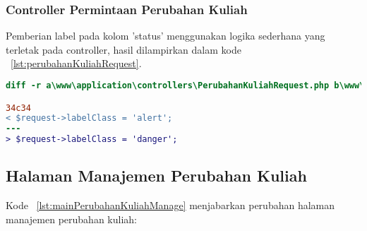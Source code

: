 \subsubsection{Controller Permintaan Perubahan Kuliah}
Pemberian label pada kolom 'status' menggunakan logika sederhana yang terletak pada controller, hasil dilampirkan dalam kode ~\ref{lst:perubahanKuliahRequest}.
\begin{lstlisting}[language=diff, caption=Controller Request Perubahan Kuliah,  basicstyle=\ttfamily, frame=single,
columns=fullflexible, keepspaces=true, breaklines=true, label={lst:perubahanKuliahRequest}]
diff -r a\www\application\controllers\PerubahanKuliahRequest.php b\www\application\controllers\PerubahanKuliahRequest.php

34c34
< $request->labelClass = 'alert';
---
> $request->labelClass = 'danger';
\end{lstlisting}

\subsection{Halaman Manajemen Perubahan Kuliah}
Kode ~\ref{lst:mainPerubahanKuliahManage} menjabarkan perubahan halaman manajemen perubahan kuliah:

